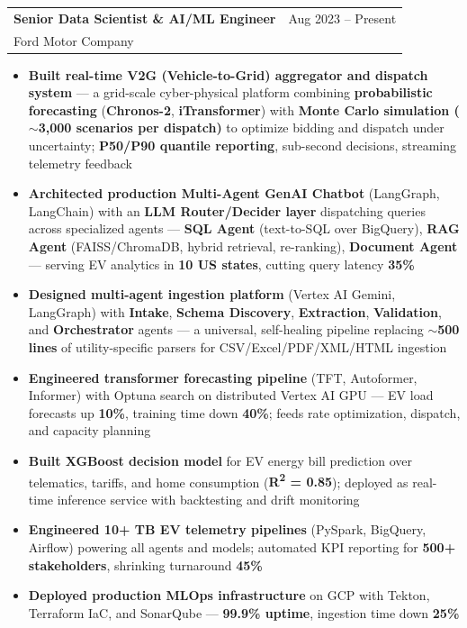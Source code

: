 \documentclass[10.5pt,letterpaper]{article}
\makeatletter
\newcommand{\cventry}[5]{%
  \noindent\begin{tabularx}{\textwidth}{@{}X r@{}}
    {\bfseries\color{headerblue}#2} & {\color{graytext}#1} \\
    {\color{accentcolor}#3}\enskip{\color{lightgray}#4} & \\
  \end{tabularx}%
  \vspace{0.02em}%
  #5%
  \vspace{0.12em}%
}
\makeatother
\begin{document}
\cventry{Aug 2023 -- Present}{Senior Data Scientist \& AI/ML Engineer}{Ford Motor Company}{Detroit, MI}{
\begin{itemize}[leftmargin=0.4cm, itemsep=0.02cm, topsep=0.04cm, label={\color{goldaccent}\textbullet}]
  \item \textbf{Built real-time V2G (Vehicle-to-Grid) aggregator and dispatch system} --- a grid-scale cyber-physical platform combining \textbf{probabilistic forecasting} (\textbf{Chronos-2}, \textbf{iTransformer}) with \textbf{Monte Carlo simulation ($\sim$3{,}000 scenarios per dispatch)} to optimize bidding and dispatch under uncertainty; \textbf{P50/P90 quantile reporting}, sub-second decisions, streaming telemetry feedback
  \item \textbf{Architected production Multi-Agent GenAI Chatbot} (LangGraph, LangChain) with an \textbf{LLM Router/Decider layer} dispatching queries across specialized agents --- \textbf{SQL Agent} (text-to-SQL over BigQuery), \textbf{RAG Agent} (FAISS/ChromaDB, hybrid retrieval, re-ranking), \textbf{Document Agent} --- serving EV analytics in \textbf{10 US states}, cutting query latency \textbf{35\%}
  \item \textbf{Designed multi-agent ingestion platform} (Vertex AI Gemini, LangGraph) with \textbf{Intake}, \textbf{Schema Discovery}, \textbf{Extraction}, \textbf{Validation}, and \textbf{Orchestrator} agents --- a universal, self-healing pipeline replacing $\sim$\textbf{500 lines} of utility-specific parsers for CSV/Excel/PDF/XML/HTML ingestion
  \item \textbf{Engineered transformer forecasting pipeline} (TFT, Autoformer, Informer) with Optuna search on distributed Vertex AI GPU --- EV load forecasts up \textbf{10\%}, training time down \textbf{40\%}; feeds rate optimization, dispatch, and capacity planning
  \item \textbf{Built XGBoost decision model} for EV energy bill prediction over telematics, tariffs, and home consumption (\textbf{R\textsuperscript{2} = 0.85}); deployed as real-time inference service with backtesting and drift monitoring
  \item \textbf{Engineered 10+ TB EV telemetry pipelines} (PySpark, BigQuery, Airflow) powering all agents and models; automated KPI reporting for \textbf{500+ stakeholders}, shrinking turnaround \textbf{45\%}
  \item \textbf{Deployed production MLOps infrastructure} on GCP with Tekton, Terraform IaC, and SonarQube --- \textbf{99.9\% uptime}, ingestion time down \textbf{25\%}
\end{itemize}
}
\end{document}
